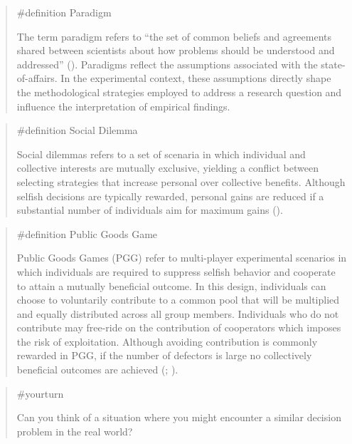 \documentclass[
  letterpaper,
]{book}
\begin{document}
\begin{quote}
\label{def-paradigm}{\#definition} Paradigm

The term paradigm refers to ``the set of common beliefs and agreements
shared between scientists about how problems should be understood and
addressed'' (). Paradigms
reflect the assumptions associated with the state-of-affairs. In the
experimental context, these assumptions directly shape the
methodological strategies employed to address a research question and
influence the interpretation of empirical findings.
\end{quote}

\begin{quote}
\label{def-socialdilemma}{\#definition} Social Dilemma

Social dilemmas refers to a set of scenaria in which individual and
collective interests are mutually exclusive, yielding a conflict between
selecting strategies that increase personal over collective benefits.
Although selfish decisions are typically rewarded, personal gains are
reduced if a substantial number of individuals aim for maximum gains
().
\end{quote}

\begin{quote}
\label{def-pgg}{\#definition} Public Goods Game

Public Goods Games (PGG) refer to multi-player experimental scenarios in
which individuals are required to suppress selfish behavior and
cooperate to attain a mutually beneficial outcome. In this design,
individuals can choose to voluntarily contribute to a common pool that
will be multiplied and equally distributed across all group members.
Individuals who do not contribute may free-ride on the contribution of
cooperators which imposes the risk of exploitation. Although avoiding
contribution is commonly rewarded in PGG, if the number of defectors is
large no collectively beneficial outcomes are achieved
(; ).
\end{quote}

\begin{quote}
{\#yourturn}

Can you think of a situation where you might encounter a similar
decision problem in the real world?
\end{quote}
\end{document}
